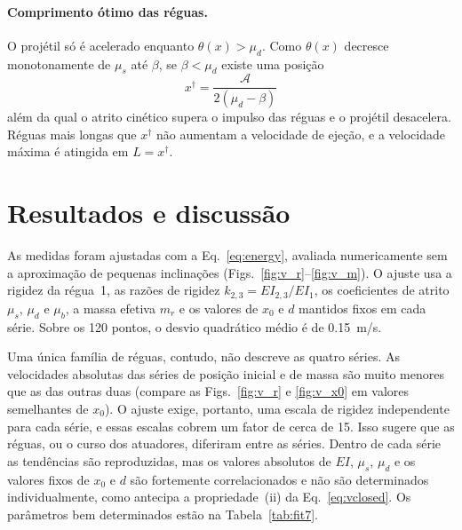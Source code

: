 \documentclass[aps,pre,twocolumn,superscriptaddress,nofootinbib,floatfix]{revtex4-2}
\begin{document}
\paragraph*{Comprimento ótimo das réguas.} O projétil só é acelerado enquanto $\theta(x)>\mu_d$. Como $\theta(x)$ decresce monotonamente de $\mu_s$ até $\beta$, se $\beta<\mu_d$ existe uma posição
\begin{equation}
  x^\dagger = \frac{\mathcal A}{2(\mu_d-\beta)}
  \label{eq:xdagger}
\end{equation}
além da qual o atrito cinético supera o impulso das réguas e o projétil desacelera. Réguas mais longas que $x^\dagger$ não aumentam a velocidade de ejeção, e a velocidade máxima é atingida em $L=x^\dagger$.

\section{Resultados e discussão}
\label{sec:results}

As medidas foram ajustadas com a Eq.~\eqref{eq:energy}, avaliada numericamente sem a aproximação de pequenas inclinações (Figs.~\ref{fig:v_r}--\ref{fig:v_m}). O ajuste usa a rigidez da régua~1, as razões de rigidez $k_{2,3}=EI_{2,3}/EI_1$, os coeficientes de atrito $\mu_s$, $\mu_d$ e $\mu_b$, a massa efetiva $m_r$ e os valores de $x_0$ e $d$ mantidos fixos em cada série. Sobre os 120 pontos, o desvio quadrático médio é de \SI{0.15}{m/s}.

Uma única família de réguas, contudo, não descreve as quatro séries. As velocidades absolutas das séries de posição inicial e de massa são muito menores que as das outras duas (compare as Figs.~\ref{fig:v_r} e \ref{fig:v_x0} em valores semelhantes de $x_0$). O ajuste exige, portanto, uma escala de rigidez independente para cada série, e essas escalas cobrem um fator de cerca de 15. Isso sugere que as réguas, ou o curso dos atuadores, diferiram entre as séries. Dentro de cada série as tendências são reproduzidas, mas os valores absolutos de $EI$, $\mu_s$, $\mu_d$ e os valores fixos de $x_0$ e $d$ são fortemente correlacionados e não são determinados individualmente, como antecipa a propriedade~(ii) da Eq.~\eqref{eq:vclosed}. Os parâmetros bem determinados estão na Tabela~\ref{tab:fit7}.
\end{document}
